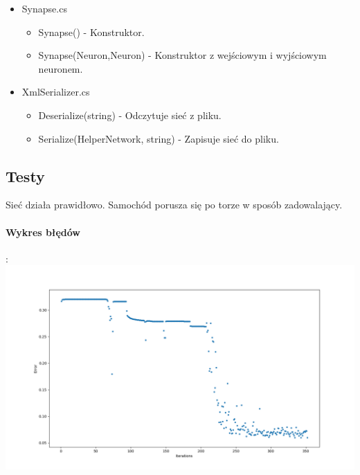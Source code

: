 \documentclass[12pt,a4paper]{article}
\begin{document}
\begin{itemize}
\begin{itemize}
			\end{itemize}
		\item Synapse.cs
			\begin{itemize}
				\item Synapse() - Konstruktor.
				\item Synapse(Neuron,Neuron) - Konstruktor z wejściowym i wyjściowym neuronem.
			\end{itemize}
		\item XmlSerializer.cs
			\begin{itemize}
				\item Deserialize(string) - Odczytuje sieć z pliku.
				\item Serialize(HelperNetwork, string) - Zapisuje sieć do pliku.
			\end{itemize}
	\end{itemize}

	\subsection{Testy}
	Sieć działa prawidłowo. Samochód porusza się po torze w sposób zadowalający.	\\
	\paragraph{Wykres błędów}:\\
	\includegraphics[scale=0.5]{supa_wykres}
\end{document}
